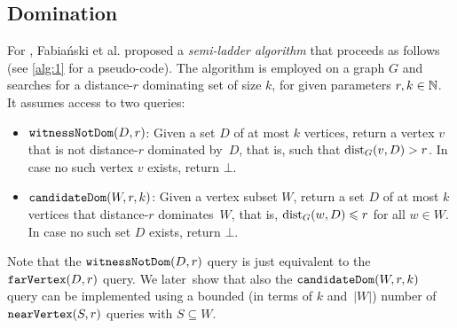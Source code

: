 \subsection{Domination}
For , Fabia\'nski et al. proposed a \emph{semi-ladder algorithm} that proceeds as follows (see \cref{alg:1} for a pseudo-code). The algorithm is employed on a graph $G$ and searches for a distance-$r$ dominating set of size $k$, for given parameters $r,k\in \mathbb{N}$. It assumes access to two queries:
\begin{itemize}
	\item $\mathtt{witnessNotDom}(D,r)$:
	Given a set $D$ of at most $k$ vertices, return a vertex $v$ that is not distance-$r$ dominated by~$D$, that is, such that $\mathrm{dist}_G(v,D)>r$. In case no such vertex $v$ exists, return $\bot$.
	\item $\mathtt{candidateDom}(W,r,k)$: Given a vertex subset $W$, return a set $D$ of at most $k$ vertices that distance-$r$ dominates~$W$, that is, $\mathrm{dist}_G(w,D)\leqslant r$ for all $w\in W$. In case no such set $D$ exists, return $\bot$.
\end{itemize}
Note that the $\mathtt{witnessNotDom}(D,r)$ query is just equivalent to the $\mathtt{farVertex}(D,r)$ query. We later~show that also the $\mathtt{candidateDom}(W,r,k)$ query can be implemented using a bounded (in terms of $k$ and~$|W|$) number of $\mathtt{nearVertex}(S,r)$ queries with $S\subseteq W$.

